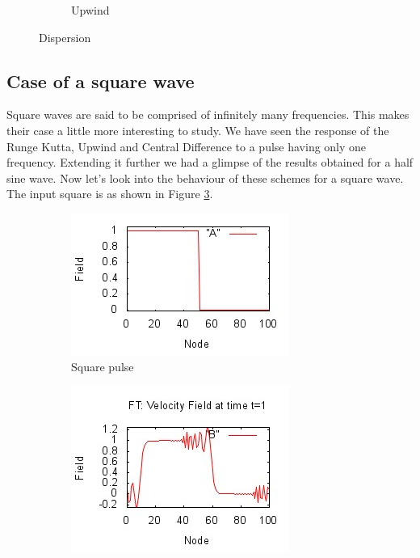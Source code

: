 \documentclass[a4paper,12pt]{report}
\begin{document}
\begin{figure}[h!]
\begin{subfigure}[b]{0.4\textwidth}
                \caption{Upwind}
                \label{fig:hfupw}
	\end{subfigure}
	\caption{Dispersion}
	\label{disp}
\end{figure}
\subsection{Case of a square wave}
Square waves are said to be comprised of infinitely many frequencies. This makes their case a little more interesting to study. We have seen the response of the Runge Kutta, Upwind and Central Difference to a pulse having only one frequency. Extending it further we had a glimpse of the results obtained for a half sine wave. Now let's look into the behaviour of these schemes for a square wave. The input square is as shown in Figure \ref{sqinit}.
\begin{figure}[h]
	\centering
	\begin{subfigure}[b]{0.5\textwidth}
		\includegraphics[width=\textwidth]{sqinit.jpeg}
                \caption{Square pulse}
                \label{sqinit}
	\end{subfigure}
	\begin{subfigure}[b]{0.5\textwidth}
		\includegraphics[width=\textwidth]{sqpulse2.jpeg}

\end{subfigure}
\end{figure}
\end{document}
